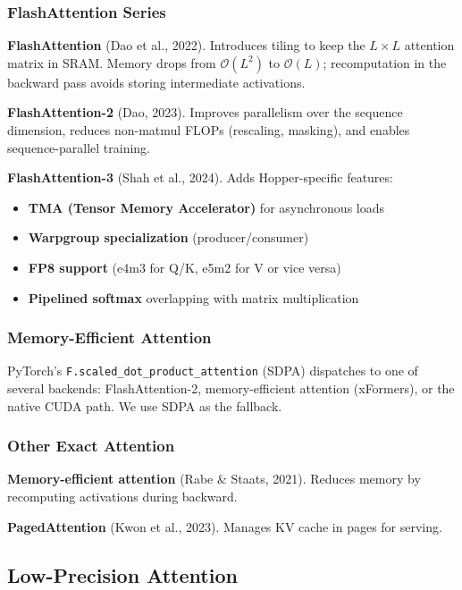 \subsubsection{FlashAttention Series}

\textbf{FlashAttention} (Dao et al., 2022). Introduces tiling to keep the 
$L \times L$ attention matrix in SRAM. Memory drops from $\mathcal{O}(L^2)$ 
to $\mathcal{O}(L)$; recomputation in the backward pass avoids storing 
intermediate activations.

\textbf{FlashAttention-2} (Dao, 2023). Improves parallelism over the sequence 
dimension, reduces non-matmul FLOPs (rescaling, masking), and enables 
sequence-parallel training.

\textbf{FlashAttention-3} (Shah et al., 2024). Adds Hopper-specific features:
\begin{itemize}
\item \textbf{TMA (Tensor Memory Accelerator)} for asynchronous loads
\item \textbf{Warpgroup specialization} (producer/consumer)
\item \textbf{FP8 support} (e4m3 for Q/K, e5m2 for V or vice versa)
\item \textbf{Pipelined softmax} overlapping with matrix multiplication

\end{itemize}
\subsubsection{Memory-Efficient Attention}

PyTorch's \texttt{F.scaled\_dot\_product\_attention} (SDPA) dispatches to one of 
several backends: FlashAttention-2, memory-efficient attention (xFormers), 
or the native CUDA path. We use SDPA as the fallback.

\subsubsection{Other Exact Attention}

\textbf{Memory-efficient attention} (Rabe \& Staats, 2021). Reduces memory by 
recomputing activations during backward.

\textbf{PagedAttention} (Kwon et al., 2023). Manages KV cache in pages for 
serving.

\subsection{Low-Precision Attention}

